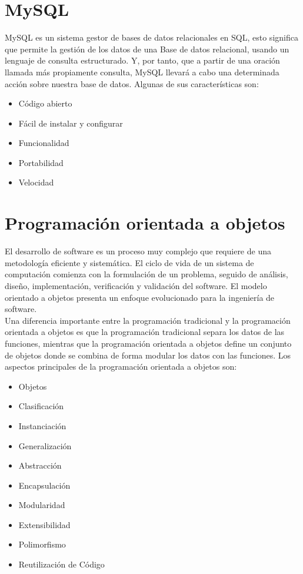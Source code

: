 \section{MySQL}
MySQL es un sistema gestor de bases de datos relacionales en SQL, esto significa que permite la gesti\'on de los datos de una Base de datos relacional, usando un lenguaje de consulta estructurado. Y, por tanto, que a partir de una oraci\'on llamada m\'as propiamente consulta, MySQL llevar\'a a cabo una determinada acci\'on sobre nuestra base de datos. \cite{mysql_server}
Algunas de sus caracter\'isticas son:
\begin{itemize}
\item C\'odigo abierto
\item F\'acil de instalar y configurar
\item Funcionalidad
\item Portabilidad
\item Velocidad
\end{itemize}

\section{Programaci\'on orientada a objetos}
El desarrollo de software es un proceso muy complejo que requiere de una metodolog\'ia eficiente y sistem\'atica. El ciclo de vida de un sistema de computaci\'on comienza con la formulaci\'on de un problema, seguido de an\'alisis, dise\~no, implementaci\'on, verificaci\'on y validaci\'on del software. El modelo orientado a objetos presenta un enfoque evolucionado para la ingenier\'ia de software.\\
Una diferencia importante entre la programaci\'on tradicional y la programaci\'on orientada a objetos es que la programaci\'on tradicional separa los datos de las funciones, mientras que la programaci\'on orientada a objetos define un conjunto de objetos donde se combina de forma modular los datos con las funciones. \cite{poo_deitel}
Los aspectos principales de la programaci\'on orientada a objetos son:
\begin{itemize}
\item Objetos
\item Clasificaci\'on
\item Instanciaci\'on
\item Generalizaci\'on
\item Abstracci\'on
\item Encapsulaci\'on
\item Modularidad
\item Extensibilidad
\item Polimorfismo
\item Reutilizaci\'on de C\'odigo
\end{itemize}

